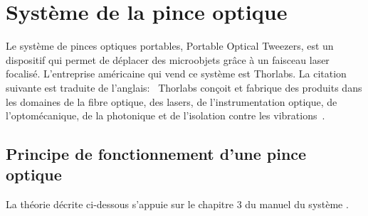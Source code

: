 


\section{Système de la pince optique}

Le système de pinces optiques portables, Portable Optical Tweezers, est un dispositif qui permet de déplacer des microobjets grâce à un faisceau laser focalisé. L'entreprise américaine qui vend ce système est Thorlabs. La citation suivante est traduite de l'anglais: \guillemotleft{}~Thorlabs conçoit et fabrique des produits dans les domaines de la fibre optique, des lasers, de l'instrumentation optique, de l'optomécanique, de la photonique et de l'isolation contre les vibrations~\guillemotright{}\cite{thorlabsWikipedia}.

\subsection{Principe de fonctionnement d'une pince optique}

La théorie décrite ci-dessous s'appuie sur le chapitre 3 du manuel du système \cite{manualPortableOpticalTweezers}.

